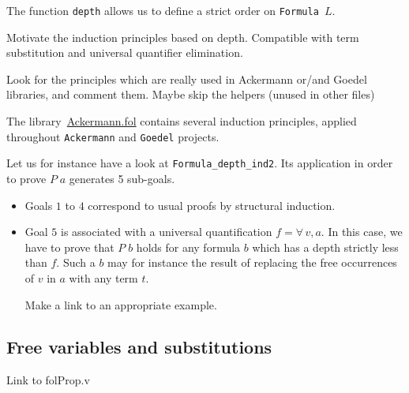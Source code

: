 The function \texttt{depth} allows us to define a strict order on 
\texttt{Formula $L$}.



\begin{todo}
Motivate the induction principles based on depth. Compatible with term substitution and universal quantifier elimination.
\end{todo}




\begin{todo}
 Look for the principles which are really used in Ackermann or/and Goedel libraries, and comment them.
 Maybe skip the helpers (unused in other files)
\end{todo}

The library~\href{../theories/html/hydras.Ackermann.fol.html}{Ackermann.fol} contains several induction principles, applied 
throughout \texttt{Ackermann} and \texttt{Goedel} projects.


Let us for instance have a look  at \texttt{Formula\_depth\_ind2}. Its application in order to prove $P\;a$ generates 5 sub-goals. 


\begin{itemize}
\item Goals $1$ to $4$ correspond to  usual proofs by structural induction.
\item Goal $5$ is associated with a universal quantification $f=\forall\,v,a$. In this case, we have to prove that $P\;b$ holds for any formula $b$ which has a depth strictly less than $f$. Such a $b$ may for instance the result of replacing the free occurrences of $v$ in $a$ with any term $t$.
  \begin{todo}
   Make a link to an appropriate example.
  \end{todo}
\end{itemize}



\subsection{Free variables and substitutions}

\begin{todo}
Link to folProp.v
\end{todo}



